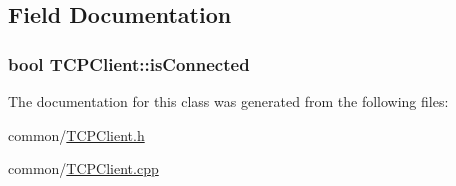 \subsection{\-Field \-Documentation}
\hypertarget{classTCPClient_a1d653a3fc1b8c2235eac2997d35bbf53}{
\subsubsection[{is\-Connected}]{\setlength{\rightskip}{0pt plus 5cm}bool {\bf \-T\-C\-P\-Client\-::is\-Connected}}}\label{classTCPClient_a1d653a3fc1b8c2235eac2997d35bbf53}


\-The documentation for this class was generated from the following files\-:\begin{DoxyCompactItemize}
\item 
common/\hyperlink{TCPClient_8h}{\-T\-C\-P\-Client.\-h}\item 
common/\hyperlink{TCPClient_8cpp}{\-T\-C\-P\-Client.\-cpp}\end{DoxyCompactItemize}
